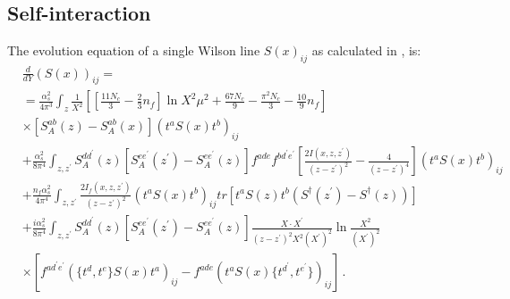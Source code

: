\documentclass[11pt,a4paper]{article}
\begin{document}
\subsection{Self-interaction}
The evolution equation of a single Wilson line $S(x)_{ij}$ as calculated in \cite{BClast}, is:
\begin{equation}\begin{split}\label{S1}
&\frac{d}{dY}(S(x))_{ij}=\\
&=\frac{\alpha_{s}^{2}}{4\pi^{3}}\int_{z}\frac{1}{X^{2}}\left[\left[\frac{11N_{c}}{3}-\frac{2}{3}n_{f}\right]\ln X^{2}\mu^{2}+\frac{67N_{c}}{9}-\frac{\pi^{2}N_{c}}{3}-\frac{10}{9}n_{f}\right]\\
&\times \left[S_{A}^{ab}(z)-S_{A}^{ab}(x)\right](t^{a}S(x)t^{b})_{ij}\\
&+\frac{\alpha_{s}^{2}}{8\pi^{4}}\int_{z,z^{\prime}}S_{A}^{dd^{\prime}}(z)\left[S_{A}^{ee^{\prime}}(z^{\prime})-S_{A}^{ee^{\prime}}(z)\right]f^{ade}f^{bd^{\prime}e^{\prime}}
\left[\frac{2I(x,z,z^{\prime})}{(z-z^{\prime})^{2}}-\frac{4}{(z-z^{\prime})^{4}}\right](t^{a}S(x)t^{b})_{ij}\\
&+\frac{n_{f}\alpha_{s}^{2}}{4\pi^{4}}\int_{z,z^{\prime}}\frac{2I_{f}(x,z,z^{\prime})}{(z-z^{\prime})^{2}}(t^{a}S(x)t^{b})_{ij}tr\left[t^{a}S(z)t^{b}(S^{\dagger}(z^{\prime})-S^{\dagger}(z))\right]\\
&+\frac{i\alpha_{s}^{2}}{8\pi^{4}}\int_{z,z^{\prime}}S_{A}^{dd^{\prime}}(z)\left[S_{A}^{ee^{\prime}}(z^{\prime})-S_{A}^{ee^{\prime}}(z)\right]\frac{X\cdot X^{\prime}}{(z-z^{\prime})^{2}X^{2}(X^{\prime})^{2}}\ln\frac{X^{2}}{(X^{\prime})^{2}}\\
&\times \left[f^{ad^{\prime}e^{\prime}}(\{t^{d},t^{e}\}S(x)t^{a})_{ij}-f^{ade}(t^{a}S(x)\{t^{d^{\prime}},t^{e^{\prime}}\})_{ij}\right]\,.\\
\end{split}\end{equation}
\end{document}
